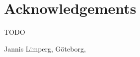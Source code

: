 \thispagestyle{plain}			%
\section*{Acknowledgements}
TODO

\vspace{1.5cm}
\hfill
Jannis Limperg, Göteborg, \monthname \space \the\year

\newpage				%
\thispagestyle{empty}
\mbox{}